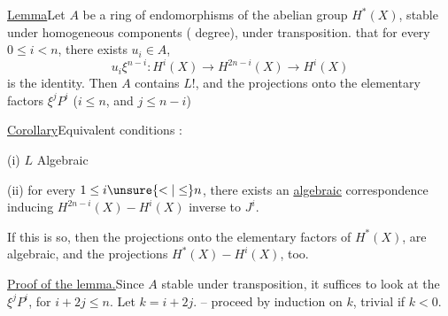
\uline{Lemma}\quad Let $A$ be a ring of endomorphisms of the abelian group $H^*(X)$, stable under homogeneous components ( degree), under transposition.   that for every $0\leq i<n$, there exists $u_i\in A$, 
\[
u_i\xi^{n-i}:H^i(X)\longrightarrow H^{2n-i}(X)\longrightarrow H^{i}(X)
\]
is the identity.
Then $A$ contains $L$!,  and the projections onto the elementary factors $\xi^jP^i$ ($i\leq n$, and  $j\leq n-i$)

\uline{Corollary}\quad Equivalent conditions :

(i) $L$ Algebraic

(ii) for every $1\leq i\unsure{<|\leq}n$, there exists an \uline{algebraic} correspondence inducing $H^{2n-i}(X)\mathbin{-}H^i(X)$ inverse to $J^i$.

 If this is so, then the \deleted{$\unsure{\xi}$} projections onto the elementary factors of $H^*(X)$, are algebraic, and the projections $H^*(X)\mathbin{-}H^i(X)$, too.

\uline{Proof of the lemma.}\quad Since $A$ stable under transposition, it suffices to look at the $\xi^jP^i$, for $i+2j\leq n$. Let $k=i+2j$. -- proceed by induction on $k$, trivial if $k<0$.

